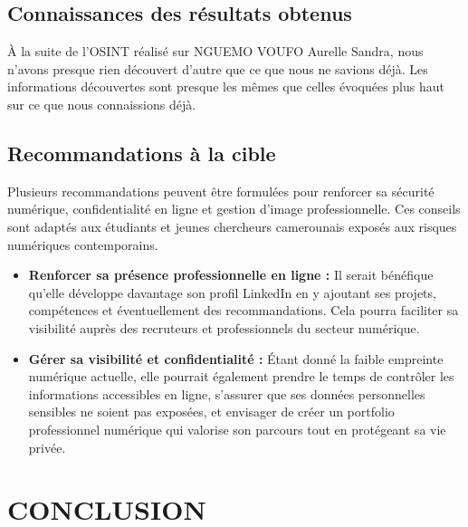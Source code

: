 \documentclass[12pt, a4paper]{article}
\begin{document}
\subsection{Connaissances des résultats obtenus}

À la suite de l'OSINT réalisé sur NGUEMO VOUFO Aurelle Sandra, nous n'avons presque rien découvert d'autre que ce que nous ne savions déjà. Les informations découvertes sont presque les mêmes que celles évoquées plus haut sur ce que nous connaissions déjà.

\subsection{Recommandations à la cible}

Plusieurs recommandations peuvent être formulées pour renforcer sa sécurité numérique, confidentialité en ligne et gestion d'image professionnelle. Ces conseils sont adaptés aux étudiants et jeunes chercheurs camerounais exposés aux risques numériques contemporains.

\begin{itemize}
	\item \textbf{Renforcer sa présence professionnelle en ligne :} Il serait bénéfique qu'elle développe davantage son profil LinkedIn en y ajoutant ses projets, compétences et éventuellement des recommandations. Cela pourra faciliter sa visibilité auprès des recruteurs et professionnels du secteur numérique.
	\item \textbf{Gérer sa visibilité et confidentialité :} Étant donné la faible empreinte numérique actuelle, elle pourrait également prendre le temps de contrôler les informations accessibles en ligne, s'assurer que ses données personnelles sensibles ne soient pas exposées, et envisager de créer un portfolio professionnel numérique qui valorise son parcours tout en protégeant sa vie privée.
\end{itemize}

\newpage

\section*{CONCLUSION}
\end{document}
